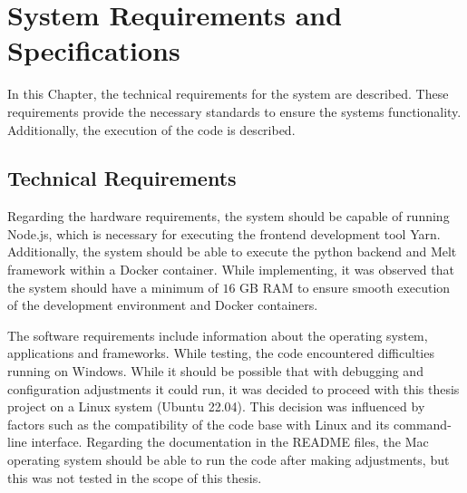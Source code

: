 \documentclass[../MasterThesis.tex]{subfiles}
\begin{document}
	
	
	

%
%
%
%
%
%
%
%
\newpage
\section{System Requirements and Specifications} \label{section:systemrequirementsandspecifications}




In this Chapter, the technical requirements for the system are described. These requirements provide the necessary standards to ensure the systems functionality. Additionally, the execution of the code is described.




\subsection{Technical Requirements} \label{subsection:technicalrequirements}



Regarding the hardware requirements, the system should be capable of running Node.js, which is necessary for executing the frontend development tool Yarn. Additionally, the system should be able to execute the python backend and Melt framework within a Docker container.
While implementing, it was observed that the system should have a minimum of $16$ GB RAM to ensure smooth execution of the development environment and Docker containers.



The software requirements include information about the operating system, applications and frameworks.
While testing, the code encountered difficulties running on Windows. While it should be possible that with debugging and configuration adjustments it could run, it was decided to proceed with this thesis project on a Linux system (Ubuntu 22.04). This decision was influenced by factors such as the compatibility of the code base with Linux and its command-line interface.
Regarding the documentation in the README files, the Mac operating system should be able to run the code after making adjustments, but this was not tested in the scope of this thesis.
\end{document}
